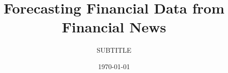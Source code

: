 \documentclass[nofilelist]{cslthse-msc}
\title{Forecasting Financial Data from Financial News}
\subtitle{SUBTITLE}
\date{\today}
\begin{document}
\renewcommand{\bibname}{References}

\makefrontmatter






{} %

\begin{appendices}




\printfilelist

\checkoddpage
\ifoddpage
\else
   \newpage
   \thispagestyle{empty}
   \mbox{ }
\fi

\end{appendices}
\end{document}
